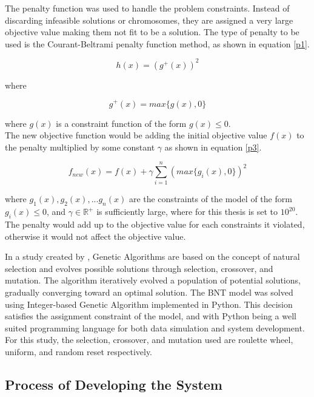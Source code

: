 \documentclass[11pt,letterpaper,]{article}
\begin{document}
	The penalty function was used to handle the problem constraints. Instead of discarding infeasible solutions or chromosomes, they are assigned a very large objective value making them not fit to be a solution. The type of penalty to be used is the Courant-Beltrami penalty function method, as shown in equation \ref{p1}.
	
	\begin{equation} 
		\label{p1}
		h(x)=(g^+(x))^2
	\end{equation}
	
	where
	
	\begin{equation} 
		\label{p2}
		g^+(x)=max\{g(x),0\}
	\end{equation}
	
	where $g(x)$ is a constraint function of the form $g(x)\le0$. 
	\\
	The new objective function would be adding the initial objective value $f(x)$ to the penalty multiplied by some constant $\gamma$ as shown in equation \ref{p3}.
	
	\begin{equation} 
		\label{p3}
		f_{new}(x)=f(x)+\gamma\sum_{i=1}^{n}(max\{g_i(x),0\})^2
	\end{equation}
	
	where $g_1(x),g_2(x),...g_n(x)$ are the constraints of the model of the form $g_i(x)\le0$, and $\gamma\in\mathbb{R}^+$ is sufficiently large, where for this thesis is set to $10^{20}$. The penalty would add up to the objective value for each constraints it violated, otherwise it would not affect the objective value.	
	
	In a study created by \textcite{Mathew2012}, Genetic Algorithms are based on the concept of natural selection and evolves possible solutions through selection, crossover, and mutation. The algorithm iteratively evolved a population of potential solutions, gradually converging toward an optimal solution. The BNT model was solved using Integer-based Genetic Algorithm implemented in Python. This decision satisfies the assignment constraint of the model, and with Python being a well suited programming language for both data simulation and system development. For this study, the selection, crossover, and mutation used are roulette wheel, uniform, and random reset respectively.
	
	\subsection{Process of Developing the System}
	
\end{document}
